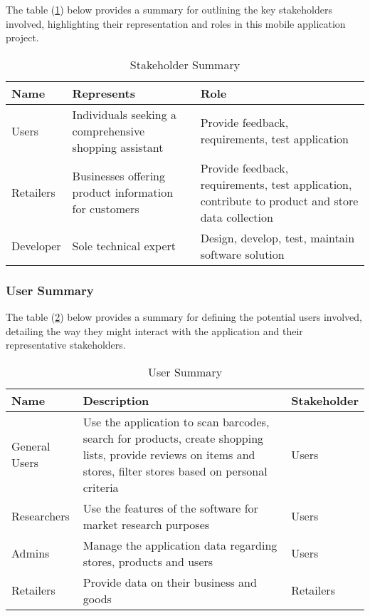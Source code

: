 The table (\ref{tab:ss}) below provides a summary for outlining the key stakeholders involved, highlighting their representation and roles in this mobile application project.

\begin{table}[H]
	\centering
	\begin{tabularx}{\textwidth}{|p{2cm}|X|X|}
		\hline
		\textbf{Name} & \textbf{Represents} & \textbf{Role}\\
		\hline
	Users & Individuals seeking a comprehensive shopping assistant & Provide feedback, requirements, test application \\ \hline
		Retailers & Businesses offering product information for customers & Provide feedback, requirements, test application, contribute to product and store data collection \\ \hline
		Developer & Sole technical expert & Design, develop, test, maintain software solution \\ \hline
	\end{tabularx}
	\caption{Stakeholder Summary}
	\label{tab:ss}
\end{table}

\subsubsection{User Summary}\label{ussect}

The table (\ref{tab:us}) below provides a summary for defining the potential users involved, detailing the way they might interact with the application and their representative stakeholders.

\begin{table}[H]
	\centering
	\begin{tabularx}{\textwidth}{|p{2cm}|X|X|}
		\hline
		\textbf{Name} & \textbf{Description} & \textbf{Stakeholder}\\
		\hline
		General Users & Use the application to scan barcodes, search for products, create shopping lists, provide reviews on items and stores, filter stores based on personal criteria & Users \\ \hline
		Researchers & Use the features of the software for market research purposes & Users \\ \hline
		Admins & Manage the application data regarding stores, products and users & Users \\ \hline
		Retailers & Provide data on their business and goods & Retailers \\ \hline
	\end{tabularx}
	\caption{User Summary}
	\label{tab:us}
\end{table}

